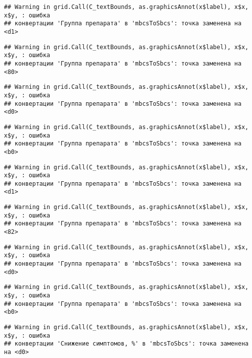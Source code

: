 \documentclass[
]{article}
\begin{document}
\begin{verbatim}
## Warning in grid.Call(C_textBounds, as.graphicsAnnot(x$label), x$x, x$y, : ошибка
## конвертации 'Группа препарата' в 'mbcsToSbcs': точка заменена на <d1>
\end{verbatim}

\begin{verbatim}
## Warning in grid.Call(C_textBounds, as.graphicsAnnot(x$label), x$x, x$y, : ошибка
## конвертации 'Группа препарата' в 'mbcsToSbcs': точка заменена на <80>
\end{verbatim}

\begin{verbatim}
## Warning in grid.Call(C_textBounds, as.graphicsAnnot(x$label), x$x, x$y, : ошибка
## конвертации 'Группа препарата' в 'mbcsToSbcs': точка заменена на <d0>
\end{verbatim}

\begin{verbatim}
## Warning in grid.Call(C_textBounds, as.graphicsAnnot(x$label), x$x, x$y, : ошибка
## конвертации 'Группа препарата' в 'mbcsToSbcs': точка заменена на <b0>
\end{verbatim}

\begin{verbatim}
## Warning in grid.Call(C_textBounds, as.graphicsAnnot(x$label), x$x, x$y, : ошибка
## конвертации 'Группа препарата' в 'mbcsToSbcs': точка заменена на <d1>
\end{verbatim}

\begin{verbatim}
## Warning in grid.Call(C_textBounds, as.graphicsAnnot(x$label), x$x, x$y, : ошибка
## конвертации 'Группа препарата' в 'mbcsToSbcs': точка заменена на <82>
\end{verbatim}

\begin{verbatim}
## Warning in grid.Call(C_textBounds, as.graphicsAnnot(x$label), x$x, x$y, : ошибка
## конвертации 'Группа препарата' в 'mbcsToSbcs': точка заменена на <d0>
\end{verbatim}

\begin{verbatim}
## Warning in grid.Call(C_textBounds, as.graphicsAnnot(x$label), x$x, x$y, : ошибка
## конвертации 'Группа препарата' в 'mbcsToSbcs': точка заменена на <b0>
\end{verbatim}

\begin{verbatim}
## Warning in grid.Call(C_textBounds, as.graphicsAnnot(x$label), x$x, x$y, : ошибка
## конвертации 'Снижение симптомов, %' в 'mbcsToSbcs': точка заменена на <d0>
\end{verbatim}
\end{document}
